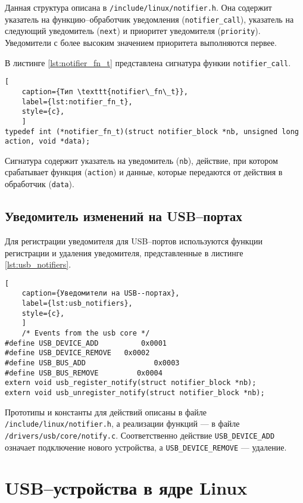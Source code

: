 Данная структура описана в \texttt{/include/linux/notifier.h}. Она содержит указатель на функцию--обработчик уведомления (\texttt{notifier\_call}), указатель на следующий уведомитель (\texttt{next}) и приоритет уведомителя (\texttt{priority}). Уведомители с более высоким значением приоритета выполняются первее.

В листинге \ref{lst:notifier_fn_t} представлена сигнатура функии \texttt{notifier\_call}.

\begin{lstlisting}[
	caption={Тип \texttt{notifier\_fn\_t}},
	label={lst:notifier_fn_t},
	style={c},
	]
typedef	int (*notifier_fn_t)(struct notifier_block *nb, unsigned long action, void *data);
\end{lstlisting}

Сигнатура содержит указатель на уведомитель (\texttt{nb}), действие, при котором срабатывает функция (\texttt{action}) и данные, которые передаются от действия в обработчик (\texttt{data}).

\subsection{Уведомитель изменений на USB--портах}

Для регистрации уведомителя для USB--портов используются функции регистрации и удаления уведомителя, представленные в листинге \ref{lst:usb_notifiers}.

\begin{lstlisting}[
	caption={Уведомители на USB--портах},
	label={lst:usb_notifiers},
	style={c},
	]
	/* Events from the usb core */
#define USB_DEVICE_ADD		    0x0001
#define USB_DEVICE_REMOVE	0x0002
#define USB_BUS_ADD		           0x0003
#define USB_BUS_REMOVE		   0x0004
extern void usb_register_notify(struct notifier_block *nb);
extern void usb_unregister_notify(struct notifier_block *nb);
\end{lstlisting}

Прототипы и константы для действий описаны в файле\\ \texttt{/include/linux/notifier.h}, а реализации функций --- в файле\\ \texttt{/drivers/usb/core/notify.c}. Соответственно действие \texttt{USB\_DEVICE\_ADD} означает подключение нового устройства, а \texttt{USB\_DEVICE\_REMOVE} --- удаление.

\section{USB--устройства в ядре Linux}

